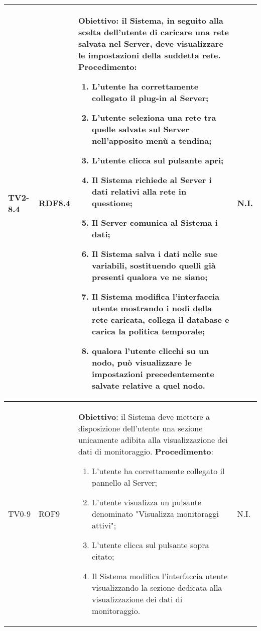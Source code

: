 \begin{longtable}{|C{.15\textwidth}|C{.13\textwidth}|m{.65\textwidth}|C{.08\textwidth}|}
TV2-8.4 & RDF8.4 &
	\textbf{Obiettivo}: il Sistema, in seguito alla scelta dell'utente di caricare una rete salvata nel Server, deve visualizzare le impostazioni della suddetta rete. \newline
	\textbf{Procedimento}:
	\begin{enumerate}
		\item L'utente ha correttamente collegato il plug-in al Server;
		\item L'utente seleziona una rete tra quelle salvate sul Server nell'apposito menù a tendina;
		\item L'utente clicca sul pulsante apri;
		\item Il Sistema richiede al Server i dati relativi alla rete in questione;
		\item Il Server comunica al Sistema i dati;
		\item Il Sistema salva i dati nelle sue variabili, sostituendo quelli già presenti qualora ve ne siano;
		\item Il Sistema modifica l'interfaccia utente mostrando i nodi della rete caricata, collega il database e carica la politica temporale;
		\item qualora l'utente clicchi su un nodo, può visualizzare le impostazioni precedentemente salvate relative a quel nodo.
	\end{enumerate}
	& N.I. \\
\hline	

TV0-9 & ROF9 &
	\textbf{Obiettivo}: il Sistema deve mettere a disposizione dell'utente una sezione unicamente adibita alla visualizzazione dei dati di monitoraggio. \newline
	\textbf{Procedimento}:
	\begin{enumerate}
		\item L'utente ha correttamente collegato il pannello al Server;
		\item L'utente visualizza un pulsante denominato "Visualizza monitoraggi attivi";
		\item L'utente clicca sul pulsante sopra citato;
		\item Il Sistema modifica l'interfaccia utente visualizzando la sezione dedicata alla visualizzazione dei dati di monitoraggio.
	\end{enumerate}
	& N.I. \\
\hline	


\end{longtable}
